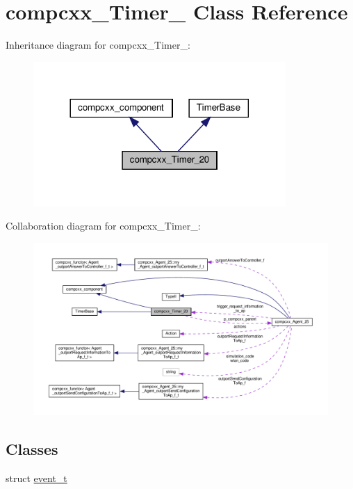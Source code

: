 \hypertarget{classcompcxx__Timer__20}{}\section{compcxx\+\_\+\+Timer\+\_ Class Reference}
\label{classcompcxx__Timer__20}


Inheritance diagram for compcxx\+\_\+\+Timer\+\_\+:\nopagebreak
\begin{figure}[H]
\begin{center}
\leavevmode
\includegraphics[width=272pt]{classcompcxx__Timer__20__inherit__graph}
\end{center}
\end{figure}


Collaboration diagram for compcxx\+\_\+\+Timer\+\_\+:\nopagebreak
\begin{figure}[H]
\begin{center}
\leavevmode
\includegraphics[width=350pt]{classcompcxx__Timer__20__coll__graph}
\end{center}
\end{figure}
\subsection*{Classes}
\begin{DoxyCompactItemize}
\item 
struct \hyperlink{structcompcxx__Timer__20_1_1event__t}{event\+\_\+t}
\end{DoxyCompactItemize}

